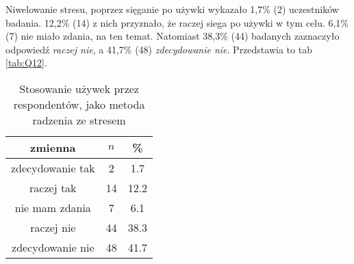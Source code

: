 Niwelowanie stresu, poprzez sięganie po używki wykazało 1,7\% (2) uczestników badania.  12,2\% (14)  z nich przyznało, że raczej siega po używki w tym celu. 6,1\% (7) nie miało zdania, na ten temat. Natomiast  38,3\% (44) badanych zaznaczyło odpowiedź \textit{raczej nie}, a  41,7\% (48) \textit{zdecydowanie nie}. Przedstawia to  tab \ref{tab:Q12}.

\begin{table}[H]
\caption{Stosowanie używek przez respondentów, jako metoda radzenia ze stresem}
\centering
\begin{tabular}{ | c | c | c |}
\hline
zmienna & $n$ & \% \\
\hline
zdecydowanie tak  &  2  & 1.7 \\
\hline
raczej tak  &  14  & 12.2 \\
\hline
nie mam zdania  &  7  & 6.1\\
\hline
raczej nie  &  44  & 38.3 \\
\hline
zdecydowanie nie  &  48  & 41.7 \\
\hline
\end{tabular}
\label{tab:Q13}
\end{table}
